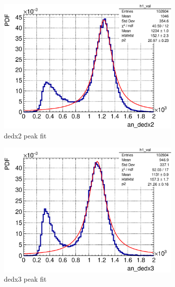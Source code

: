 \begin{figure}[t]
\begin{subfigure}{\dbfigwid\textwidth}
         \includegraphics[width=\textwidth]{figures/sel/ans_dedx2_pdf_al2_selpr_con_test.eps}
         \caption{dedx2 peak fit}
         \label{subfig:dedx2-peak}
    \end{subfigure}
    \begin{subfigure}{\dbfigwid\textwidth}
         \includegraphics[width=\textwidth]{figures/sel/ans_dedx3_pdf_al2_selpr_con_test.eps}
         \caption{dedx3 peak fit}
         \label{subfig:dedx3-peak}
    \end{subfigure}
    \\
    \begin{subfigure}{\dbfigwid\textwidth}

\end{subfigure}
\end{figure}
